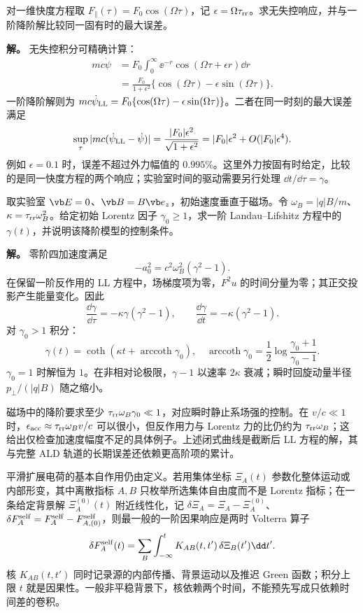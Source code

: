 \begin{exbox}
对一维快度方程取 $F_\parallel(\tau)=F_0\cos(\Omega\tau)$，记 $\epsilon=\Omega\tau_{\rm rr}$。求无失控响应，并与一阶降阶解比较同一固有时的最大误差。

\textbf{解。} 无失控积分可精确计算：
\begin{align*}
 mc\dot\psi
 &=F_0\int_0^\infty \ee^{-r}\cos(\Omega\tau+\epsilon r)\dd r\\
 &=\frac{F_0}{1+\epsilon^2}
 \{\cos(\Omega\tau)-\epsilon\sin(\Omega\tau)\}.
\end{align*}
一阶降阶解则为 $mc\dot\psi_{\rm LL}=F_0\{\cos(\Omega\tau)-\epsilon\sin(\Omega\tau)\}$。二者在同一时刻的最大误差满足
\[
 \sup_\tau|mc(\dot\psi_{\rm LL}-\dot\psi)|
 =\frac{|F_0|\epsilon^2}{\sqrt{1+\epsilon^2}}
 =|F_0|\epsilon^2+O(|F_0|\epsilon^4).
\]
例如 $\epsilon=0.1$ 时，误差不超过外力幅值的 $0.995\%$。这里外力按固有时给定，比较的是同一快度方程的两个响应；实验室时间的驱动需要另行处理 $\dd t/\dd\tau=\gamma$。
\end{exbox}

\begin{exbox}
取实验室 $\vb E=0$、$\vb B=B\vb e_z$，初始速度垂直于磁场。令 $\omega_B=|q|B/m$、$\kappa=\tau_{\rm rr}\omega_B^2$。给定初始 Lorentz 因子 $\gamma_0\ge1$，求一阶 Landau--Lifshitz 方程中的 $\gamma(t)$，并说明该降阶模型的控制条件。

\textbf{解。} 零阶四加速度满足
\[
 -a_0^2=c^2\omega_B^2(\gamma^2-1).
\]
在保留一阶反作用的 LL 方程中，场梯度项为零，$F^2u$ 的时间分量为零；其正交投影产生能量变化。因此
\[
 \frac{\dd\gamma}{\dd\tau}=-\kappa\gamma(\gamma^2-1),
 \qquad \frac{\dd\gamma}{\dd t}=-\kappa(\gamma^2-1).
\]
对 $\gamma_0>1$ 积分：
\[
 \gamma(t)=\coth\!\left(\kappa t+\operatorname{arccoth}\gamma_0\right),
 \quad \operatorname{arccoth}\gamma_0=\frac12\log\frac{\gamma_0+1}{\gamma_0-1}.
\]
$\gamma_0=1$ 时解恒为 $1$。在非相对论极限，$\gamma-1$ 以速率 $2\kappa$ 衰减；瞬时回旋动量半径 $p_\perp/(|q|B)$ 随之缩小。

磁场中的降阶要求至少 $\tau_{\rm rr}\omega_B\gamma_0\ll1$，对应瞬时静止系场强的控制。在 $v/c\ll1$ 时，$\epsilon_{\rm acc}\approx\tau_{\rm rr}\omega_Bv/c$ 可以很小，但反作用力与 Lorentz 力的比仍约为 $\tau_{\rm rr}\omega_B$；这给出仅检查加速度幅度不足的具体例子。上述闭式曲线是截断后 LL 方程的解，其与完整 ALD 轨道的长期误差还依赖更高阶项的累计。
\end{exbox}


平滑扩展电荷的基本自作用仍由定义。若用集体坐标 \(\Xi_A(t)\) 参数化整体运动或内部形变，其中离散指标 \(A,B\) 只枚举所选集体自由度而不是 Lorentz 指标；在一条给定背景解 \(\Xi_A^{(0)}(t)\) 附近线性化，记 \(\delta\Xi_A=\Xi_A-\Xi_A^{(0)}\)、\(\delta F_A^{\rm self}=F_A^{\rm self}-F_{A,(0)}^{\rm self}\)，则最一般的一阶因果响应是两时 Volterra 算子
\begin{equation}
 \delta F_A^{\rm self}(t)
 =\sum_B\int_{-\infty}^{t}
 K_{AB}(t,t')\,\delta\Xi_B(t')\dd t'.
 \label{eq:phys-rr-finite-size-memory}
\end{equation}
核 \(K_{AB}(t,t')\) 同时记录源的内部传播、背景运动以及推迟 Green 函数；积分上限 \(t\) 就是因果性。一般非平稳背景下，核依赖两个时间，不能预先写成只依赖时间差的卷积。

